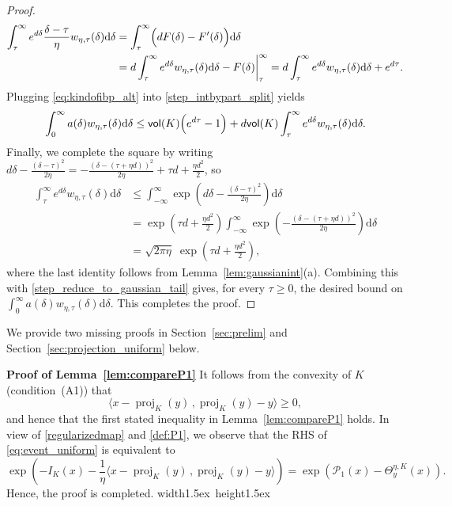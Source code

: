 \documentclass[11pt,letterpaper]{article}
\newcommand{\proj}{\operatorname{proj}}
\newcommand{\D}{\mathrm{d}}
\newcommand{\vol}{\mathsf{vol}}
\newcommand{\inner}[2]{\langle #1\,,#2 \rangle}
\newcommand*{\QEDA}{\hfill\hbox{\vrule width1.5ex height1.5ex}}
\begin{document}
\begin{proof}
\begin{align}
\int_\tau^\infty e^{d\delta}\frac{\delta-\tau}{\eta}w_{\eta,\tau}(\delta) \D\delta
&=
\int_\tau^\infty \Bigl(dF(\delta)-F'(\delta)\Bigr) \D\delta \nonumber\\
&=
d\int_\tau^\infty e^{d\delta}w_{\eta,\tau}(\delta) \D\delta
-F(\delta)\bigg|_{\tau}^{\infty}
=
d\int_\tau^\infty e^{d\delta}w_{\eta,\tau}(\delta) \D\delta
+e^{d\tau}.
\label{eq:kindofibp_alt}
\end{align}
Plugging \eqref{eq:kindofibp_alt} into \eqref{step_intbypart_split} yields
\begin{align}
\int_0^\infty a(\delta) w_{\eta,\tau}(\delta) \D\delta
\le
\vol(K)\Bigl(e^{d\tau}-1\Bigr)
+
d \vol(K)\int_\tau^\infty e^{d\delta}w_{\eta,\tau}(\delta) \D\delta.
\label{step_reduce_to_gaussian_tail}
\end{align}
Finally, we complete the square by writing $d\delta-\frac{(\delta-\tau)^2}{2\eta}
=
-\frac{\left(\delta-(\tau+\eta d)\right)^2}{2\eta}
+\tau d+\frac{\eta d^2}{2}$,
so
\begin{align}
\int_\tau^\infty e^{d\delta}w_{\eta,\tau}(\delta) \D\delta
&\le
\int_{-\infty}^{\infty}\exp\!\left(d\delta-\frac{(\delta-\tau)^2}{2\eta}\right) \D\delta \nonumber\\
&=
\exp\!\left(\tau d+\frac{\eta d^2}{2}\right)
\int_{-\infty}^{\infty}\exp\!\left(-\frac{\left(\delta-(\tau+\eta d)\right)^2}{2\eta}\right) \D\delta \nonumber\\
&=
\sqrt{2\pi\eta}\;
\exp\!\left(\tau d+\frac{\eta d^2}{2}\right),
\end{align}
where the last identity follows from Lemma~\ref{lem:gaussianint}(a).
Combining this with \eqref{step_reduce_to_gaussian_tail} gives, for every $\tau\ge 0$, the desired bound on $\int_0^\infty a(\delta) w_{\eta,\tau}(\delta) \D\delta$. This completes the proof.
\end{proof}



We provide two missing proofs in Section~\ref{sec:prelim} and Section~\ref{sec:projection_uniform} below. 

\textbf{Proof of Lemma~\ref{lem:compareP1}}
It follows from the convexity of $K$ (condition~(A1)) that 
\[\inner{x-\proj_K(y)}{\proj_K(y)-y}\geq 0,\]
and hence that the first stated inequality in Lemma~\ref{lem:compareP1} holds. 
In view of \eqref{regularizedmap} and \eqref{def:P1}, we observe that the RHS of \eqref{eq:event_uniform} is equivalent to
\[
\exp\left(-I_K(x)-\frac{1}{\eta}\inner{x-\proj_K(y)}{\proj_K(y)-y}\right) = \exp(\mathcal{P}_1(x)- \Theta_y^{\eta,K}(x)).
\]
Hence, the proof is completed.
\QEDA
\end{document}
